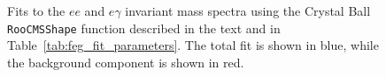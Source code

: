 \documentclass[dissertation_bw.tex]{subfiles}
\begin{document}
\begin{figure}
	\centering
	\hspace{1cm}
	\caption{Fits to the $ee$ and $e\gamma$ invariant mass spectra using the Crystal Ball \texttt{RooCMSShape} function described in the text and in Table~\ref{tab:feg_fit_parameters}.  The total fit is shown in blue, while the background component is shown in red.}
	\label{fig:feg_fits}
\end{figure}
\end{document}
